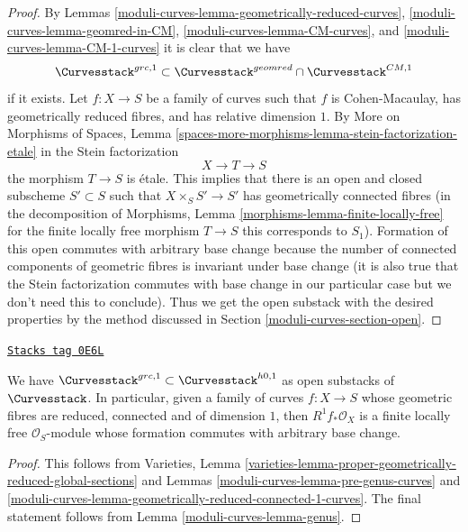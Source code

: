 \begin{proof}
By Lemmas \ref{moduli-curves-lemma-geometrically-reduced-curves},
\ref{moduli-curves-lemma-geomred-in-CM}, \ref{moduli-curves-lemma-CM-curves}, and \ref{moduli-curves-lemma-CM-1-curves}
it is clear that we have
$$
\Curvesstack^{grc, 1}
\subset
\Curvesstack^{geomred} \cap \Curvesstack^{CM, 1}
$$
if it exists. Let $f : X \to S$ be a family of curves such that $f$ is
Cohen-Macaulay, has geometrically reduced fibres, and
has relative dimension $1$. By
More on Morphisms of Spaces, Lemma
\ref{spaces-more-morphisms-lemma-stein-factorization-etale}
in the Stein factorization
$$
X \to T \to S
$$
the morphism $T \to S$ is \'etale. This implies that
there is an open and closed subscheme $S' \subset S$
such that $X \times_S S' \to S'$ has geometrically
connected fibres (in the decomposition of
Morphisms, Lemma \ref{morphisms-lemma-finite-locally-free}
for the finite locally free morphism $T \to S$
this corresponds to $S_1$).
Formation of this open commutes with arbitrary base change
because the number of connected components of geometric
fibres is invariant under base change (it is also true
that the Stein factorization commutes with base change
in our particular case but we don't need this to conclude).
Thus we get the open substack with the desired properties
by the method discussed in Section \ref{moduli-curves-section-open}.
\end{proof}

\begin{lemma}[Geomredcon in h0 1]
\label{moduli-curves-lemma-geomredcon-in-h0-1}
\href{https://stacks.math.columbia.edu/tag/0E6L}{\texttt{Stacks tag 0E6L}}

We have $\Curvesstack^{grc, 1} \subset \Curvesstack^{h0, 1}$
as open substacks of $\Curvesstack$. In particular, given
a family of curves $f : X \to S$
whose geometric fibres are reduced, connected and of dimension $1$, then
$R^1f_*\mathcal{O}_X$ is a finite locally free $\mathcal{O}_S$-module
whose formation commutes with arbitrary base change.
\end{lemma}

\begin{proof}
This follows from Varieties, Lemma
\ref{varieties-lemma-proper-geometrically-reduced-global-sections}
and Lemmas \ref{moduli-curves-lemma-pre-genus-curves} and
\ref{moduli-curves-lemma-geometrically-reduced-connected-1-curves}.
The final statement follows from Lemma \ref{moduli-curves-lemma-genus}.
\end{proof}

